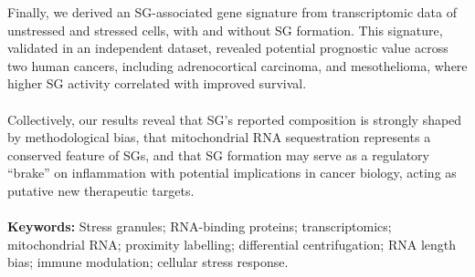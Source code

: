 Finally, we derived an SG-associated gene signature from transcriptomic data of unstressed and stressed cells, with and without SG formation. This signature, validated in an independent dataset, revealed potential prognostic value across two human cancers, including adrenocortical carcinoma, and mesothelioma, where higher SG activity correlated with improved survival.
\\
\\
Collectively, our results reveal that SG's reported composition is strongly shaped by methodological bias, that mitochondrial RNA sequestration represents a conserved feature of SGs, and that SG formation may serve as a regulatory “brake” on inflammation with potential implications in cancer biology, acting as putative new therapeutic targets.
\\
\\
\textbf{Keywords:} Stress granules; RNA-binding proteins; transcriptomics; mitochondrial RNA; proximity labelling; differential centrifugation; RNA length bias; immune modulation; cellular stress response.

